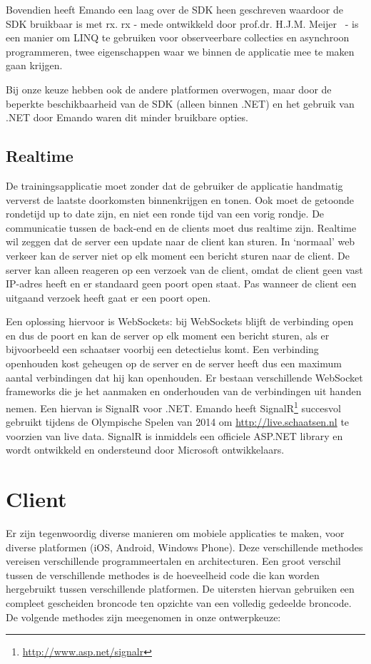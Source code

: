 Bovendien heeft Emando een laag over de \mylaps SDK heen geschreven waardoor de SDK bruikbaar is met \acf{rx}. \ac{rx} - mede ontwikkeld door prof.dr. H.J.M. Meijer~\cite{meijer2011world} - is een manier om LINQ te gebruiken voor observeerbare collecties en asynchroon programmeren, twee eigenschappen waar we binnen de applicatie mee te maken gaan krijgen.

Bij onze keuze hebben ook de andere platformen overwogen, maar door de beperkte beschikbaarheid van de \mylaps SDK (alleen binnen .NET) en het gebruik van .NET door Emando waren dit minder bruikbare opties.

\subsection{Realtime}\label{sec:orientatie-real-time}
De trainingsapplicatie moet zonder dat de gebruiker de applicatie handmatig ververst de laatste doorkomsten binnenkrijgen en tonen. Ook moet de getoonde rondetijd up to date zijn, en niet een ronde tijd van een vorig rondje. De communicatie tussen de back-end en de clients moet dus realtime zijn. Realtime wil zeggen dat de server een update naar de client kan sturen. In `normaal' web verkeer kan de server niet op elk moment een bericht sturen naar de client. De server kan alleen reageren op een verzoek van de client, omdat de client geen vast IP-adres heeft en er standaard geen poort open staat. Pas wanneer de client een uitgaand verzoek heeft gaat er een poort open.

Een oplossing hiervoor is WebSockets: bij WebSockets blijft de verbinding open en dus de poort en kan de server op elk moment een bericht sturen, als er bijvoorbeeld een schaatser voorbij een detectielus komt. Een verbinding openhouden kost geheugen op de server en de server heeft dus een maximum aantal verbindingen dat hij kan openhouden. Er bestaan verschillende WebSocket frameworks die je het aanmaken en onderhouden van de verbindingen uit handen nemen. Een hiervan is SignalR voor .NET. Emando heeft SignalR\footnote{\url{http://www.asp.net/signalr}} succesvol gebruikt tijdens de Olympische Spelen van 2014 om \url{http://live.schaatsen.nl} te voorzien van live data. SignalR is inmiddels een officiele ASP.NET library en wordt ontwikkeld en ondersteund door Microsoft ontwikkelaars.

\section{Client} \label{sec:orientatie-client}
Er zijn tegenwoordig diverse manieren om mobiele applicaties te maken, voor diverse platformen (iOS, Android, Windows Phone). Deze verschillende methodes vereisen verschillende programmeertalen en architecturen. Een groot verschil tussen de verschillende methodes is de hoeveelheid code die kan worden hergebruikt tussen verschillende platformen. De uitersten hiervan gebruiken een compleet gescheiden broncode ten opzichte van een volledig gedeelde broncode. De volgende methodes zijn meegenomen in onze ontwerpkeuze:

